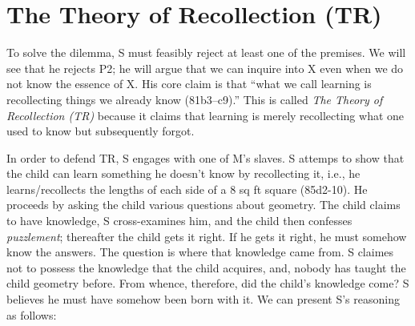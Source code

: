 \documentclass[10 pt]{article}
\begin{document}
\section*{The Theory of Recollection (TR)}
To solve the dilemma, S must feasibly reject at least one of the premises. We will see that he rejects P2; he will argue that we can inquire into X even when we do not know the essence of X. His core claim is that ``what we call learning is recollecting things we already know (81b3--c9).'' This is called \emph{The Theory of Recollection (TR)} because it claims that learning is merely recollecting what one used to know but subsequently forgot. 

In order to defend TR, S engages with one of M's slaves. S attemps to show that the child can learn something he doesn't know by recollecting it, i.e., he learns/recollects the lengths of each side of a 8 sq ft square (85d2-10).  He proceeds by asking the child various questions about geometry. The child claims to have knowledge, S cross-examines him, and the child then confesses \emph{puzzlement}; thereafter the child gets it right. If he gets it right, he must somehow know the answers. The question is where that knowledge came from.  S claimes not to possess the knowledge that the child acquires, and, nobody has taught the child geometry before. From whence, therefore, did the child's knowledge come? S believes he must have somehow been born with it. We can present S's reasoning as follows: 

\end{document}
